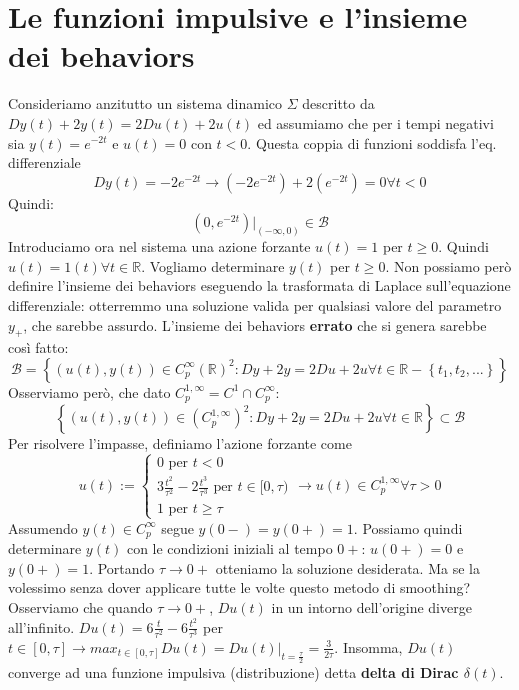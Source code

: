 \documentclass[11pt]{article}
\begin{document}
\section{Le funzioni impulsive e l'insieme dei behaviors}
Consideriamo anzitutto un sistema dinamico $\Sigma$ descritto da $Dy(t) + 2y(t) = 2Du(t)+2u(t)$ ed assumiamo che per i tempi negativi sia $y(t) = e^{-2t}$ e $u(t)=0$ con $t<0$.
Questa coppia di funzioni soddisfa l'eq. differenziale
\begin{displaymath}
    Dy(t) = -2e^{-2t} \rightarrow (-2e^{-2t}) + 2(e^{-2t}) = 0 \forall t<0
\end{displaymath}
Quindi:
\begin{displaymath}
    \left(0, e^{-2t}\right)|_{(-\infty, 0)} \in \mathcal{B}
\end{displaymath}
Introduciamo ora nel sistema una azione forzante $u(t) = 1$ per $t \ge 0$. Quindi $u(t) = 1(t) \forall t \in \mathbb{R}$. Vogliamo determinare $y(t)$ per $t \ge 0$. Non possiamo però definire l'insieme dei behaviors eseguendo la trasformata di Laplace sull'equazione differenziale: otterremmo una soluzione valida per qualsiasi valore del parametro $y_+$, che sarebbe assurdo. L'insieme dei behaviors \textbf{errato} che si genera sarebbe così fatto:
\begin{displaymath}
    \mathcal{B}= \left\{\left(u(t), y(t)\right) \in C^\infty_p (\mathbb{R})^2 : Dy+ 2y = 2Du +2u \forall t \in \mathbb{R}-\left\{t_1,t_2,...\right\}\right\}
\end{displaymath}
Osserviamo però, che dato $C^{1, \infty}_p = C^1 \cap C_p^\infty$:
\begin{displaymath}
    \left\{\left(u(t), y(t)\right) \in (C_p^{1,\infty})^2 : Dy + 2y = 2Du + 2u \forall t \in \mathbb{R}\right\} \subset \mathcal{B}
\end{displaymath}
Per risolvere l'impasse, definiamo l'azione forzante come
\begin{displaymath}
    u(t) :=
    \begin{cases}
        0 \textrm{ per }t<0                                                    \\
        3\frac{t^2}{\tau^2}- 2\frac{t^3}{\tau^3} \textrm{ per }t \in [0, \tau) \\
        1 \textrm{ per } t \ge \tau
    \end{cases}
    \rightarrow u(t) \in C_p^{1,\infty} \forall \tau > 0
\end{displaymath}
Assumendo $y(t) \in C_p^\infty$ segue $y(0-) = y(0+) = 1$. Possiamo quindi determinare $y(t)$ con le condizioni iniziali al tempo $0+$: $u(0+)=0$ e $y(0+)=1$.
Portando $\tau \rightarrow 0+$ otteniamo la soluzione desiderata. Ma se la volessimo senza dover applicare tutte le volte questo metodo di smoothing?
Osserviamo che quando $\tau \rightarrow 0+$, $Du(t)$ in un intorno dell'origine diverge all'infinito. $Du(t) = 6\frac{t}{\tau^2} - 6\frac{t^2}{\tau^3}$ per $t \in [0, \tau] \rightarrow max_{t \in [0, \tau]} Du(t) = Du(t)|_{t=\frac{\tau}{2}}=\frac{3}{2\tau}$.
Insomma, $Du(t)$ converge ad una funzione impulsiva (distribuzione) detta \textbf{delta di Dirac $\delta(t)$}.
\end{document}
